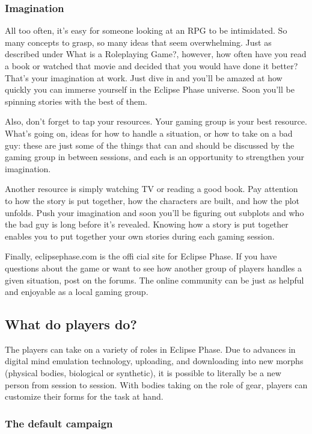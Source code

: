 \subsubsection{Imagination}
\label{sec:imagination}

All too often, it's easy for someone looking at an RPG to be
intimidated. So many concepts to grasp, so many ideas that seem
overwhelming. Just as described under What is a Roleplaying Game?,
however, how often have you read a book or watched that movie and
decided that you would have done it better? That's your imagination at
work. Just dive in and you'll be amazed at how quickly you can immerse
yourself in the Eclipse Phase universe. Soon you'll be spinning
stories with the best of them.

Also, don't forget to tap your resources. Your gaming group is your
best resource. What's going on, ideas for how to handle a situation,
or how to take on a bad guy: these are just some of the things that
can and should be discussed by the gaming group in between sessions,
and each is an opportunity to strengthen your imagination.

Another resource is simply watching TV or reading a good book. Pay
attention to how the story is put together, how the characters are
built, and how the plot unfolds. Push your imagination and soon you'll
be figuring out subplots and who the bad guy is long before it's
revealed. Knowing how a story is put together enables you to put
together your own stories during each gaming session.

Finally, eclipsephase.com is the offi cial site for Eclipse Phase. If
you have questions about the game or want to see how another group of
players handles a given situation, post on the forums. The online
community can be just as helpful and enjoyable as a local gaming
group.

\subsection{What do players do?}
\label{sec:what-do-players}

The players can take on a variety of roles in Eclipse Phase. Due to
advances in digital mind emulation technology, uploading, and
downloading into new morphs (physical bodies, biological or
synthetic), it is possible to literally be a new person from session
to session. With bodies taking on the role of gear, players can
customize their forms for the task at hand.

\subsubsection{The default campaign}
\label{sec:default-campaign}

